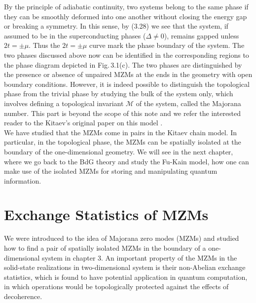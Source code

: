 \documentclass[11pt, oneside]{book}
\theoremstyle{break}
\theoremstyle{break}
\begin{document}
By the principle of adiabatic continuity, two systems belong to the same phase if they can be smoothly deformed into one another without closing the energy gap or breaking a symmetry. In this sense, by (3.28) we see that the system, if assumed to be in the superconducting phases ($\Delta\neq 0$), remains gapped unless $2t =\pm \mu$. Thus the $2t = \pm \mu$ curve mark the phase boundary of the system. The two phases discussed above now can be identified in the corresponding regions to the phase diagram depicted in Fig.\,3.1(c). The two phases are distinguished by the presence or absence of unpaired MZMs at the ends in the geometry with open boundary conditions. However, it is indeed possible to distinguish the topological phase from the trivial phase by studying the bulk of the system only, which involves defining a topological invariant $\mathcal{M}$ of the system, called the Majorana number. This part is beyond the scope of this note and we refer the interested reader to the Kitaev's original paper on this model \cite{KitaevChain}. \\

We have studied that the MZMs come in pairs in the Kitaev chain model. In particular, in the topological phase, the MZMs can be spatially isolated at the boundary of the one-dimensional geometry. We will see in the next chapter, where we go back to the BdG theory and study the Fu-Kain model, how one can make use of the isolated MZMs for storing and manipulating quantum information.


\chapter{Exchange Statistics of MZMs}
We were introduced to the idea of Majorana zero modes (MZMs) and studied how to find a pair of spatially isolated MZMs in the boundary of a one-dimensional system in chapter 3. An important property of the MZMs in the solid-state realizations in two-dimensional system is their non-Abelian exchange statistics, which is found to have potential application in quantum computation, in which operations would be topologically protected against the effects of decoherence. \\
\end{document}
